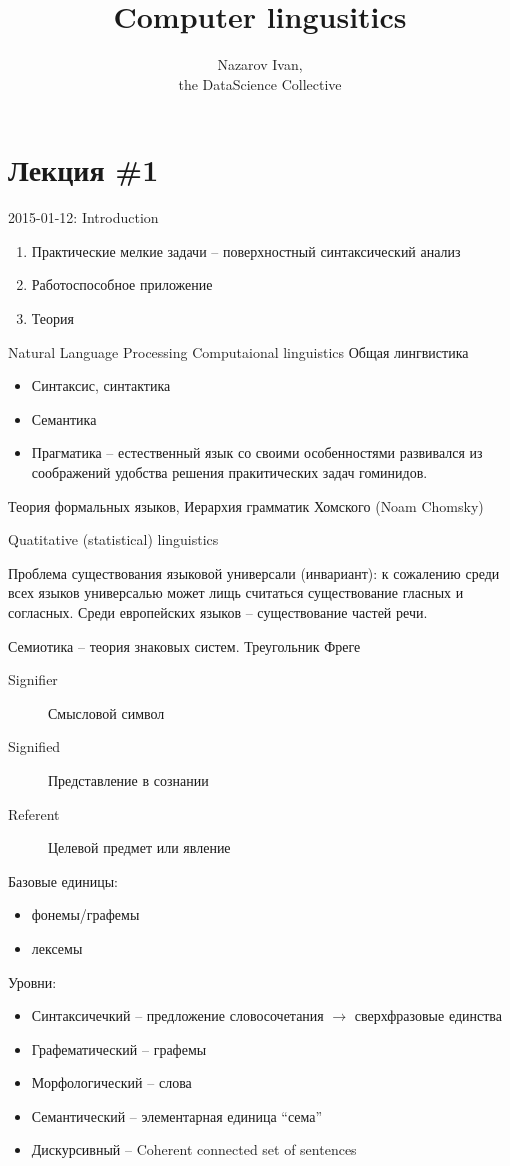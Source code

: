 \documentclass[a4paper]{article}
\title{Computer lingusitics}
\author{Nazarov Ivan, \rus{101мНОД(ИССА)}\\the DataScience Collective}
\newcommand{\eng}[1]{\foreignlanguage{english}{#1}}
\begin{document}
\maketitle

\section{Лекция \#1} %
\label{sec:lecture_1}
\eng{2015-01-12: Introduction}
\begin{enumerate}
	\item Практические мелкие задачи -- поверхностный синтаксический анализ
	\item Работоспособное приложение
	\item Теория
\end{enumerate}
\eng{Natural Language Processing}
\eng{Computaional linguistics}
Общая лингвистика \begin{itemize}
	\item Синтаксис, синтактика
	\item Семантика
	\item Прагматика -- естественный язык со своими особенностями развивался из соображений удобства решения пракитических задач гоминидов.
\end{itemize}	
Теория формальных языков, Иерархия грамматик Хомского (\eng{Noam Chomsky})

\eng{Quatitative (statistical) linguistics}

Проблема существования языковой универсали (инвариант):
к сожалению среди всех языков универсалью может лищь считаться существование гласных и согласных.
Среди европейских языков -- существование частей речи.

Семиотика -- теория знаковых систем.
Треугольник Фреге
\begin{description}
	\item[\eng{Signifier}] Смысловой символ
	\item[\eng{Signified}] Представление в сознании
	\item[\eng{Referent}] Целевой предмет или явление
\end{description}

Базовые единицы:
\begin{itemize}
	\item фонемы/графемы
	\item лексемы
\end{itemize}

Уровни:
\begin{itemize}
	\item Синтаксичечкий -- предложение
		словосочетания $\to$ сверхфразовые единства
	\item Графематический -- графемы
	\item Морфологический -- слова
	\item Семантический -- элементарная единица ``сема''
	\item Дискурсивный -- \eng{Coherent connected set of sentences}
\end{itemize}
\end{document}
